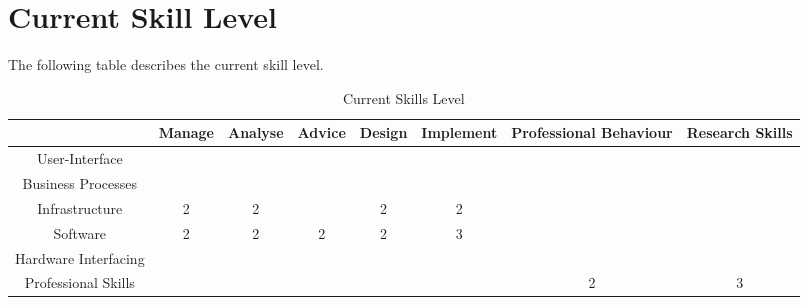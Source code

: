 
\section{Current Skill Level}
\label{sec:current}

The following table describes the current skill level. 

\begin{table}[H]
	\centering
	\begin{tabular}{|c|c|c|c|c|c|c|c|}
		\hline
		& Manage & Analyse & Advice & Design & Implement & Professional Behaviour & Research Skills \\ \hline
		User-Interface & & & & & & & \\ \hline
		Business Processes & & & & & & & \\ \hline
		Infrastructure & 2 & 2 & & 2 & 2 & & \\ \hline
		Software & 2 & 2 & 2 & 2 & 3 & & \\ \hline
		Hardware Interfacing & & & & & & & \\ \hline
		Professional Skills & & & & & & 2 & 3 \\ \hline
	\end{tabular}
	\caption{Current Skills Level}
	\label{currentskills}
\end{table}